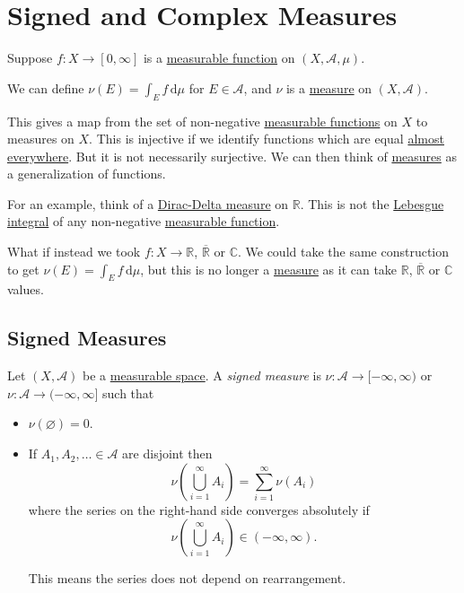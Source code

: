 \chapter{Signed and Complex Measures}
\begin{prev}
	Suppose \(f \colon X \to [0,\infty]\) is a \hyperref[def:measurable-function]{measurable function} on \((X, \mathcal{A}, \mu)\).

	We can define \(\nu(E) = \int_E f \,\mathrm{d} \mu\)  for \(E \in \mathcal{A}\), and \(\nu\) is a \hyperref[def:measure]{measure} on \((X, \mathcal{A})\).

	This gives a map from the set of non-negative \hyperref[def:measurable-function]{measurable functions} on \(X\) to measures on \(X\). This is
	injective if we identify functions which are equal \hyperref[def:mu-almost-everywhere]{almost everywhere}. But it is not necessarily surjective.
	We can then think of \hyperref[def:measure]{measures} as a generalization of functions.

	For an example, think of a \hyperref[eg:Dirac-Delta measure]{Dirac-Delta measure} on \(\mathbb{R}\). This is not the \hyperref[def:integrable]{Lebesgue integral}
	of any non-negative \hyperref[def:measurable-function]{measurable function}.
\end{prev}

What if instead we took \(f \colon X \to \mathbb{R}\), \(\overline{\mathbb{R}}\) or \(\mathbb{C}\). We could take the same construction to get
\(\nu(E) = \int_E f \,\mathrm{d} \mu\), but this is no longer a \hyperref[def:measure]{measure} as it can take \(\mathbb{R}\), \(\overline{\mathbb{R}}\) or \(\mathbb{C}\) values.

\section{Signed Measures}
\begin{definition}\label{def:signed-measure}
	Let \((X, \mathcal{A})\) be a \hyperref[def:measurable-space]{measurable space}. A \emph{signed measure} is \(\nu \colon \mathcal{A} \to [-\infty,\infty)\) or
		\(\nu \colon \mathcal{A} \to (-\infty, \infty]\) such that
	\begin{itemize}
		\item \(\nu(\varnothing ) = 0\).
		\item If \(A_1,A_2,\ldots \in \mathcal{A}\) are disjoint then
		      \[
			      \nu\left( \bigcup_{i=1}^\infty A_i \right) = \sum_{i=1}^\infty \nu(A_i)
		      \]
		      where the series on the right-hand side converges absolutely if
		      \[
			      \nu\left( \bigcup_{i=1}^\infty A_{i} \right) \in (-\infty,\infty).
		      \]
		      \begin{remark}
			      This means the series does not depend on rearrangement.
		      \end{remark}
	\end{itemize}
\end{definition}

